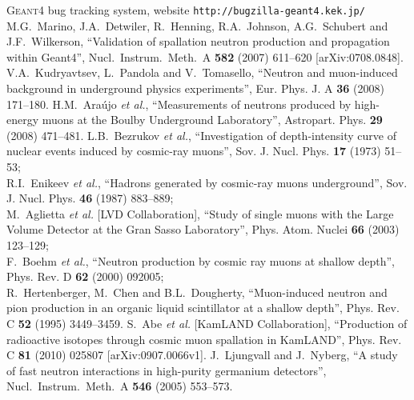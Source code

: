 \documentclass[article]{IEEEtran}
\begin{document}
\begin{thebibliography}{1}
%
\textsc{Geant4} bug tracking system, website \texttt{http://bugzilla-geant4.kek.jp/}
%
M.G.~Marino, J.A.~Detwiler, R.~Henning, R.A.~Johnson, A.G.~Schubert and J.F.~Wilkerson,
``Validation of spallation neutron production and propagation within Geant4'',
Nucl.\ Instrum.\ Meth.\  A {\bf 582} (2007) 611--620
[arXiv:0708.0848].
%
V.A.~Kudryavtsev, L.~Pandola and V.~Tomasello,
``Neutron and muon-induced background in underground physics experiments'',
Eur. Phys. J. A \textbf{36} (2008) 171--180.
%
H.M.~Ara\'{u}jo \emph{et al.},
``Measurements of neutrons produced by high-energy muons at the Boulby Underground Laboratory'',
Astropart. Phys. \textbf{29} (2008) 471--481.
%
L.B.~Bezrukov \emph{et al.}, 
``Investigation of depth-intensity curve of nuclear events induced by cosmic-ray muons'',
Sov. J. Nucl. Phys. \textbf{17} (1973) 51--53;\\
R.I.~Enikeev \emph{et al.}, 
``Hadrons generated by cosmic-ray muons underground'',
Sov. J. Nucl. Phys. \textbf{46} (1987) 883--889;\\
M.~Aglietta  \emph{et al.} [LVD Collaboration], 
``Study of single muons with the Large Volume Detector at the Gran Sasso Laboratory'',
Phys. Atom. Nuclei
\textbf{66} (2003) 123--129; \\
F.~Boehm \emph{et al.}, 
``Neutron production by cosmic ray muons at shallow depth'',
Phys. Rev. D \textbf{62} (2000) 092005;\\
R.~Hertenberger, M.~Chen and B.L.~Dougherty, 
``Muon-induced neutron and pion production in an organic liquid scintillator at a shallow depth'',
Phys. Rev. C \textbf{52} (1995) 3449--3459.
%
S.~Abe \emph{et al.} [KamLAND Collaboration],
``Production of radioactive isotopes through cosmic muon spallation in KamLAND'',
Phys. Rev. C \textbf{81} (2010) 025807
[arXiv:0907.0066v1].
%
J.~Ljungvall and J.~Nyberg,
``A study of fast neutron interactions in high-purity germanium detectors'',
Nucl.\ Instrum.\ Meth.\  A \textbf{546} (2005) 553--573.
\end{thebibliography}
\end{document}
